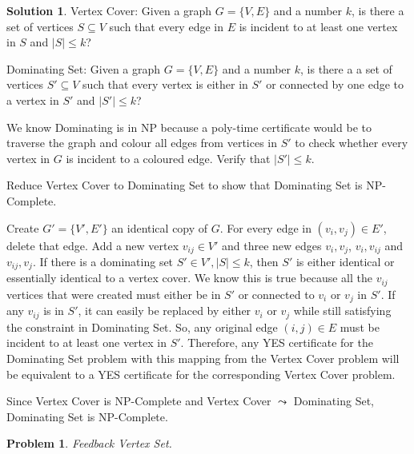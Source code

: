 \documentclass{article}
\newtheorem{problem}{Problem}
\theoremstyle{definition}
\newtheorem*{solution}{Solution}
\begin{document}
\begin{solution}

Vertex Cover: Given a graph \(G=\{V,E\}\) and a number \(k\), is there a set of vertices \(S\subseteq V\) such that every edge in \(E\) is incident to at least one vertex in \(S\) and \(|S|\leq k\)?

Dominating Set: Given a graph \(G=\{V,E\}\) and a number \(k\), is there a a set of vertices \(S'\subseteq V\) such that every vertex is either in \(S'\) or connected by one edge to a vertex in \(S'\) and \(|S'|\leq k\)?

We know Dominating is in NP because a poly-time certificate would be to traverse the graph and colour all edges from vertices in \(S'\) to check whether every vertex in \(G\) is incident to a coloured edge. Verify that \(|S'|\leq k\).

Reduce Vertex Cover to Dominating Set to show that Dominating Set is NP-Complete.

Create \(G'=\{V',E'\}\) an identical copy of \(G\). For every edge in \((v_i,v_j)\in E'\), delete that edge. Add a new vertex \(v_{ij}\in V'\) and three new edges \(v_i,v_j\), \(v_i,v_{ij}\) and \(v_{ij},v_j\). If there is a dominating set \(S'\in V', |S|\leq k\), then \(S'\) is either identical or essentially identical to a vertex cover. We know this is true because all the \(v_{ij}\) vertices that were created must either be in \(S'\) or connected to \(v_i\) or \(v_j\) in \(S'\). If any \(v_{ij}\) is in \(S'\), it can easily be replaced by either \(v_i\) or \(v_j\) while still satisfying the constraint in Dominating Set. So, any original edge \((i,j)\in E\) must be incident to at least one vertex in \(S'\). Therefore, any YES certificate for the Dominating Set problem with this mapping from the Vertex Cover problem will be equivalent to a YES certificate for the corresponding Vertex Cover problem.

Since Vertex Cover is NP-Complete and Vertex Cover \(\leadsto \) Dominating Set, Dominating Set is NP-Complete.

\end{solution}

\begin{problem}

Feedback Vertex Set.

\end{problem}
\end{document}
